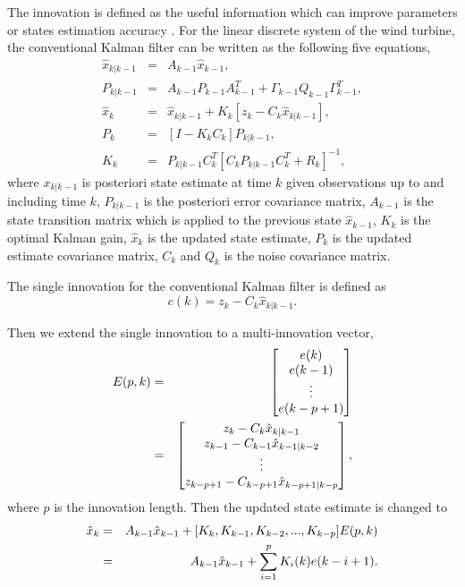 The innovation is defined as the useful information which can improve parameters
or states estimation accuracy \cite{ref:17}. For the linear discrete system of the
wind turbine,
the conventional Kalman filter can be written as the
following five equations,
\begin{eqnarray}
  \hat{x}_{k|k-1} &=& A_{k-1}\hat{x}_{k-1}, \\
  P_{k|k-1} &=& A_{k-1}P_{k-1}A^T_{k-1} + \Gamma_{k-1}Q_{k-1}\Gamma^T_{k-1}, \\
  \hat{x}_k &=& \hat{x}_{k|k-1} + K_k[z_k - C_k\hat{x}_{k|k-1}], \\
  P_k &=& [I - K_k C_k]P_{k|k-1}, \\
  K_k &=& P_{k|k-1}C^T_k[C_k P_{k|k-1}C^T_k + R_k]^{-1},
\end{eqnarray}
where ${x}_{k|k-1}$ is  posteriori state estimate at time $k$ given
observations up to and including time $k$, $P_{k|k-1}$ is the
posteriori error covariance matrix, $A_{k-1}$ is the state transition matrix
which is applied to the previous state $\hat{x}_{k-1}$, $K_k$ is the
optimal Kalman gain, $\hat{x}_k$ is the updated state estimate, $P_k$ is
the updated estimate covariance matrix, $C_k$ and $Q_k$ is the noise covariance matrix.

The single innovation for the conventional Kalman filter is defined as
\begin{equation}
  c(k) = z_k - C_k\hat{x}_{k|k-1}.
\end{equation}

Then we extend the single innovation to a multi-innovation vector,
\begin{eqnarray}
E(p, k) &=& \begin{bmatrix}
e(k) \\
e(k-1) \\
\vdots \\
e(k-p+1)
\end{bmatrix} \notag\\
&=&
\begin{bmatrix}
z_k - C_k\hat{x}_{k|k-1} \\
z_{k-1} - C_{k-1}\hat{x}_{k-1|k-2} \\
\vdots \\
z_{k-p+1} - C_{k-p+1}\hat{x}_{k-p+1|k-p}
\end{bmatrix},
\end{eqnarray}
where $p$ is the innovation length. Then the updated state estimate is changed to
\begin{eqnarray}
  \hat{x}_k &=& A_{k-1}\hat{x}_{k-1} + [K_{k}, K_{k-1}, K_{k-2}, ... , K_{k-p}] E(p, k) \notag\\
  &=& A_{k-1}\hat{x}_{k-1} + \sum^p_{i=1}K_i(k)e(k-i+1).
\end{eqnarray}

